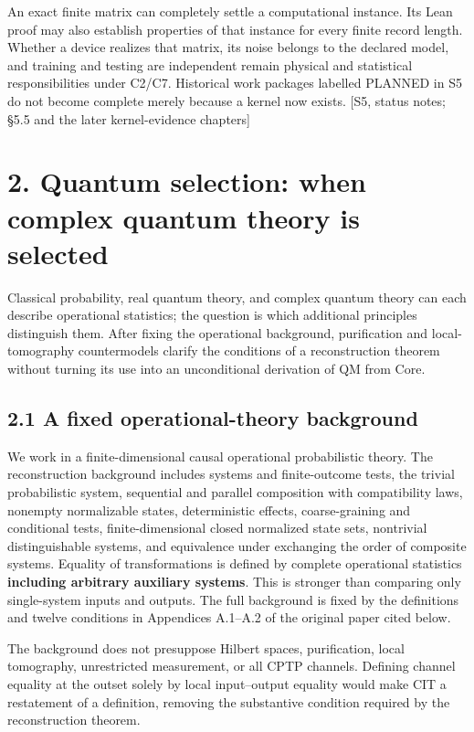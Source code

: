 \documentclass[
  11pt,
  oneside]{book}
\begin{document}
An exact finite matrix can completely settle a computational instance.
Its Lean proof may also establish properties of that instance for every
finite record length. Whether a device realizes that matrix, its noise
belongs to the declared model, and training and testing are independent
remain physical and statistical responsibilities under C2/C7. Historical
work packages labelled PLANNED in S5 do not become complete merely
because a kernel now exists. {[}S5, status notes; §5.5 and the later
kernel-evidence chapters{]}

\chapter{2. Quantum selection: when complex quantum theory is
selected}\label{ch-2}

Classical probability, real quantum theory, and complex quantum theory
can each describe operational statistics; the question is which
additional principles distinguish them. After fixing the operational
background, purification and local-tomography countermodels clarify the
conditions of a reconstruction theorem without turning its use into an
unconditional derivation of QM from Core.

\section{2.1 A fixed operational-theory background}

We work in a finite-dimensional causal operational probabilistic theory.
The reconstruction background includes systems and finite-outcome tests,
the trivial probabilistic system, sequential and parallel composition
with compatibility laws, nonempty normalizable states, deterministic
effects, coarse-graining and conditional tests, finite-dimensional
closed normalized state sets, nontrivial distinguishable systems, and
equivalence under exchanging the order of composite systems. Equality of
transformations is defined by complete operational statistics
\textbf{including arbitrary auxiliary systems}. This is stronger than
comparing only single-system inputs and outputs. The full background is
fixed by the definitions and twelve conditions in Appendices A.1--A.2 of
the original paper cited below.

The background does not presuppose Hilbert spaces, purification, local
tomography, unrestricted measurement, or all CPTP channels. Defining
channel equality at the outset solely by local input--output equality
would make CIT a restatement of a definition, removing the substantive
condition required by the reconstruction theorem.
\end{document}
